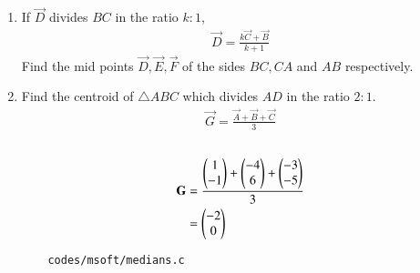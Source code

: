 \begin{enumerate}[label=\thesubsection.\arabic*.,ref=\thesubsection.\theenumi]
\item If $\vec{D}$ divides $BC$ in the ratio $k : 1$,
		\begin{align}
			\vec{D}= \frac{k\vec{C}+\vec{B}}{k+1}
	  \label{eq:app-section_formula}
		\end{align}
		Find the mid points $\vec{D}, \vec{E}, \vec{F}$ of the sides $BC, CA$ and $AB$ respectively.
	\\
		  
	\item Find the centroid  of $\triangle ABC$ which divides $AD$ in the ratio $2:1$.
		\begin{align}
			\vec{G}=\frac{\vec{A}+\vec{B}+\vec{C}}{3}
		\end{align}
   \\
\solution
\begin{equation}
\begin{split}
\label{eq:centroid}
    \mathbf{G}&= \frac{\begin{pmatrix}1\\-1\end{pmatrix}+\begin{pmatrix}-4\\6\end{pmatrix}+\begin{pmatrix}-3\\-5\end{pmatrix}}{3}\\    
     &= \begin{pmatrix}-2\\0\end{pmatrix}
\end{split}
\end{equation}
\begin{lstlisting}
	codes/msoft/medians.c
\end{lstlisting}
\end{enumerate}
